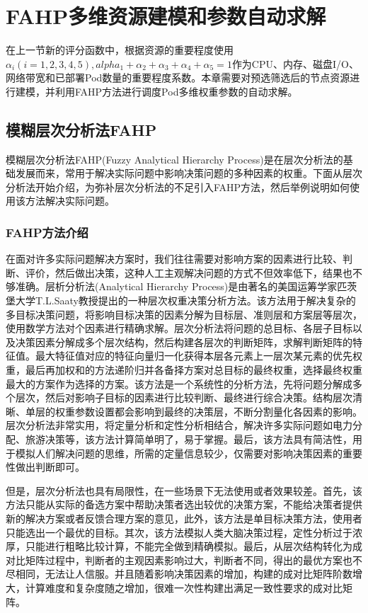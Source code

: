 \chapter{FAHP多维资源建模和参数自动求解}
在上一节新的评分函数中，根据资源的重要程度使用\begin{math}\alpha_{i}(i=1,2,3,4,5),  alpha_{1}+\alpha_{2}+\alpha_{3}+\alpha_{4}+\alpha_{5}=1\end{math}作为CPU、内存、磁盘I/O、网络带宽和已部署Pod数量的重要程度系数。本章需要对预选筛选后的节点资源进行建模，并利用FAHP方法进行调度Pod多维权重参数的自动求解。

\section{模糊层次分析法FAHP}
模糊层次分析法FAHP(Fuzzy Analytical Hierarchy Process)是在层次分析法的基础发展而来，常用于解决实际问题中影响决策问题的多种因素的权重。下面从层次分析法开始介绍，为弥补层次分析法的不足引入FAHP方法，然后举例说明如何使用该方法解决实际问题。

\subsection{FAHP方法介绍}
在面对许多实际问题解决方案时，我们往往需要对影响方案的因素进行比较、判断、评价，然后做出决策，这种人工主观解决问题的方式不但效率低下，结果也不够准确。层析分析法(Analytical Hierarchy Process)是由著名的美国运筹学家匹茨堡大学T.L.Saaty教授提出的一种层次权重决策分析方法。该方法用于解决复杂的多目标决策问题，将影响目标决策的因素分解为目标层、准则层和方案层等层次，使用数学方法对个因素进行精确求解。层次分析法将问题的总目标、各层子目标以及决策因素分解成多个层次结构，然后构建各层次的判断矩阵，求解判断矩阵的特征值。最大特征值对应的特征向量归一化获得本层各元素上一层次某元素的优先权重，最后再加权和的方法递阶归并各备择方案对总目标的最终权重，选择最终权重最大的方案作为选择的方案。该方法是一个系统性的分析方法，先将问题分解成多个层次，然后对影响子目标的因素进行比较判断、最终进行综合决策。结构层次清晰、单层的权重参数设置都会影响到最终的决策层，不断分割量化各因素的影响。层次分析法非常实用，将定量分析和定性分析相结合，解决许多实际问题如电力分配、旅游决策等，该方法计算简单明了，易于掌握。最后，该方法具有简洁性，用于模拟人们解决问题的思维，所需的定量信息较少，仅需要对影响决策因素的重要性做出判断即可。

但是，层次分析法也具有局限性，在一些场景下无法使用或者效果较差。首先，该方法只能从实际的备选方案中帮助决策者选出较优的决策方案，不能给决策者提供新的解决方案或者反馈合理方案的意见，此外，该方法是单目标决策方法，使用者只能选出一个最优的目标。其次，该方法模拟人类大脑决策过程，定性分析过于浓厚，只能进行粗略比较计算，不能完全做到精确模拟。最后，从层次结构转化为成对比矩阵过程中，判断者的主观因素影响过大，判断者不同，得出的最优方案也不尽相同，无法让人信服。并且随着影响决策因素的增加，构建的成对比矩阵阶数增大，计算难度和复杂度随之增加，很难一次性构建出满足一致性要求的成对比矩阵。

